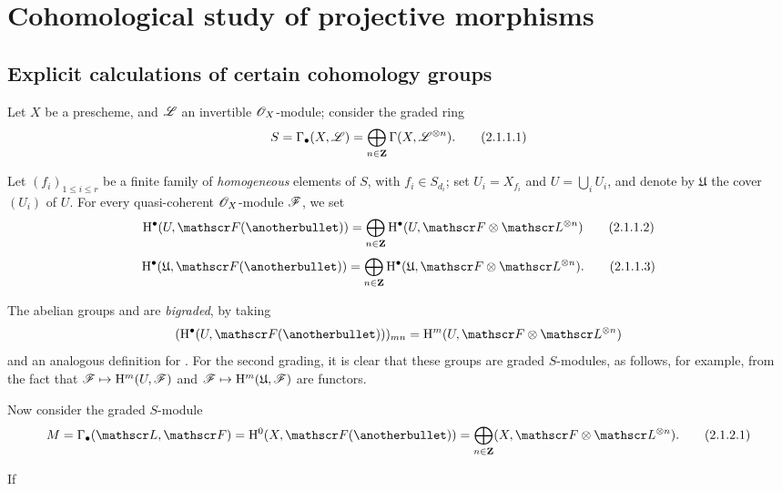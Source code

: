 \section{Cohomological study of projective morphisms}
\label{section:III.2}


\subsection{Explicit calculations of certain cohomology groups}
\label{subsection:III.2.1}

\begin{env}[2.1.1]
\label{III.2.1.1}
Let $X$ be a prescheme, and $\mathscr{L}$ an invertible $\mathscr{O}_X$-module;
consider the graded ring 
\[
\label{III.2.1.1.1}
  S = \Gamma_\bullet(X,\mathscr{L}) = \bigoplus_{n\in\mathbf{Z}}\Gamma(X,\mathscr{L}^{\otimes n}).
\tag{2.1.1.1}
\]

Let $(f_i)_{1\leq i\leq r}$ be a finite family of \emph{homogeneous} elements of $S$, with $f_i\in S_{d_i}$;
set $U_i=X_{f_i}$ and $U=\bigcup_i U_i$, and denote by $\mathfrak{U}$ the cover $(U_i)$ of $U$.
For every quasi-coherent $\mathscr{O}_X$-module $\mathscr{F}$, we set
\[
\label{III.2.1.1.2}
  \HH^\bullet(U,\sh{F}(\anotherbullet)) = \bigoplus_{n\in\bb{Z}}\HH^\bullet(U,\sh{F}\otimes\sh{L}^{\otimes n})
\tag{2.1.1.2}
\]
\[
\label{III.2.1.1.3}
  \HH^\bullet(\mathfrak{U},\sh{F}(\anotherbullet)) = \bigoplus_{n\in\bb{Z}}\HH^\bullet(\mathfrak{U},\sh{F}\otimes\sh{L}^{\otimes n}).
\tag{2.1.1.3}
\]

The abelian groups  and  are \emph{bigraded}, by taking
\[
  (\HH^\bullet(U,\sh{F}(\anotherbullet)))_{mn} = \HH^m(U,\sh{F}\otimes\sh{L}^{\otimes n})
\]
and an analogous definition for .
For the second grading, it is clear that these groups are graded $S$-modules, as follows, for example, from the fact that $\sh{F}\mapsto\HH^m(U,\sh{F})$ and $\sh{F}\mapsto\HH^m(\mathfrak{U},\sh{F})$ are functors.
\end{env}

\begin{env}[2.1.2]
\label{III.2.1.2}
Now consider the graded $S$-module 
\[
\label{III.2.1.2.1}
  M = \Gamma_\bullet(\sh{L},\sh{F}) = \HH^0(X,\sh{F}(\anotherbullet)) = \bigoplus_{n\in\bb{Z}}(X,\sh{F}\otimes\sh{L}^{\otimes n}).
\tag{2.1.2.1}
\]

If
\end{env}




